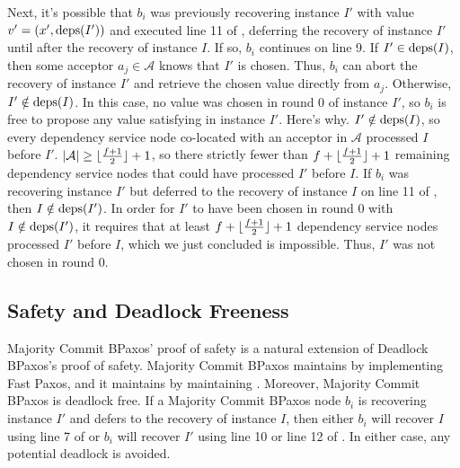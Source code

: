 Next, it's possible that $b_i$ was previously recovering instance $I'$ with
value $v' = (x', \text{deps}(I'))$ and executed line 11 of ,
deferring the recovery of instance $I'$ until after the recovery of instance
$I$.
%
If so, $b_i$ continues on line 9. If $I' \in \text{deps}(I)$, then some acceptor $a_j
\in \mathcal{A}$ knows that $I'$ is chosen. Thus, $b_i$ can abort the recovery
of instance $I'$ and retrieve the chosen value directly from $a_j$.
%
Otherwise, $I' \notin \text{deps}(I)$. In this case, no value was chosen in round $0$
of instance $I'$, so $b_i$ is free to propose any value satisfying
 in instance $I'$. Here's why. $I' \notin \text{deps}(I)$,
so every dependency service node co-located with an acceptor in $\mathcal{A}$
processed $I$ before $I'$. $|\mathcal{A}| \geq \lfloor\frac{f + 1}{2}\rfloor + 1$, so there
strictly fewer than $f + \lfloor\frac{f + 1}{2}\rfloor + 1$ remaining dependency service
nodes that could have processed $I'$ before $I$.  If $b_i$ was recovering
instance $I'$ but deferred to the recovery of instance $I$ on line 11 of
, then $I \notin \text{deps}(I')$.  In order for $I'$ to have
been chosen in round $0$ with $I \notin \text{deps}(I')$, it requires that at least
$f + \lfloor\frac{f + 1}{2}\rfloor + 1$ dependency service nodes processed $I'$ before $I$,
which we just concluded is impossible. Thus, $I'$ was not chosen in round $0$.

\subsection{Safety and Deadlock Freeness}
Majority Commit BPaxos' proof of safety is a natural extension of Deadlock
BPaxos's proof of safety. Majority Commit BPaxos maintains
 by implementing Fast Paxos, and it maintains
 by maintaining .
%
Moreover, Majority Commit BPaxos is deadlock free. If a Majority Commit BPaxos
node $b_i$ is recovering instance $I'$ and defers to the recovery of instance
$I$, then either $b_i$ will recover $I$ using line 7 of
 or $b_i$ will recover $I'$ using line 10 or line
12 of . In either case, any potential deadlock is
avoided.
